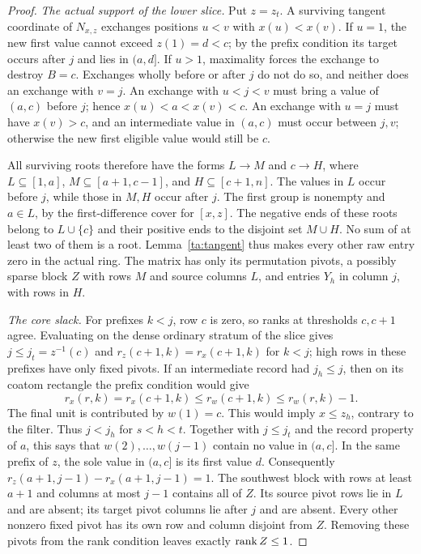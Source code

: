 \begin{proof}
\smallskip\noindent\emph{The actual support of the lower slice.}
Put $z=z_t$. A surviving tangent coordinate of $N_{x,z}$ exchanges
positions $u<v$ with $x(u)<x(v)$. If $u=1$, the new first value
cannot exceed $z(1)=d<c$; by the prefix condition its target occurs
after $j$ and lies in $(a,d]$. If $u>1$, maximality
forces the exchange to destroy $B=c$. Exchanges wholly before or after
$j$ do not do so, and neither does an exchange with $v=j$.
An exchange with $u<j<v$ must bring a value of $(a,c)$ before $j$;
hence $x(u)<a<x(v)<c$. An exchange with $u=j$ must have $x(v)>c$,
and an intermediate value in $(a,c)$ must occur between $j,v$;
otherwise the new first eligible value would still be $c$.

All surviving roots therefore have the forms $L\longrightarrow M$
and $c\longrightarrow H$, where
$L\subseteq[1,a]$, $M\subseteq[a+1,c-1]$, and
$H\subseteq[c+1,n]$. The values in $L$ occur before $j$, while those
in $M,H$ occur after $j$. The first group is nonempty and $a\in L$,
by the first-difference cover for $[x,z]$.
The negative ends of these roots belong to $L\cup\{c\}$ and their
positive ends to the disjoint set $M\cup H$. No sum of at least two
of them is a root. Lemma~\ref{ta:tangent} thus makes every other raw
entry zero in the actual ring. The matrix has only its permutation
pivots, a possibly sparse block $Z$ with rows $M$ and source columns
$L$, and entries $Y_h$ in column $j$, with rows in $H$.

\smallskip\noindent\emph{The core slack.}
For prefixes $k<j$, row $c$ is zero, so ranks at thresholds $c,c+1$
agree. Evaluating on the dense ordinary stratum of the slice gives
$j\leq j_t=z^{-1}(c)$ and
$r_z(c+1,k)=r_x(c+1,k)$ for $k<j$; high rows in these prefixes have
only fixed pivots.
If an intermediate record had $j_h\leq j$, then on its coatom
rectangle the prefix condition would give
\[
 r_x(r,k)=r_x(c+1,k)\leq r_w(c+1,k)\leq r_w(r,k)-1.
\]
The final unit is contributed by $w(1)=c$. This would imply
$x\leq z_h$, contrary to the filter. Thus $j<j_h$ for $s<h<t$.
Together with $j\leq j_t$ and the record property of $a$, this says
that $w(2),\ldots,w(j-1)$ contain no value in $(a,c]$.
In the same prefix of $z$, the sole value in $(a,c]$ is its first
value $d$. Consequently
$r_z(a+1,j-1)-r_x(a+1,j-1)=1$.
The southwest block with rows at least $a+1$ and columns at most
$j-1$ contains all of $Z$. Its source pivot rows lie in $L$ and are
absent; its target pivot columns lie after $j$ and are absent.
Every other nonzero fixed pivot has its own row and column disjoint
from $Z$. Removing these pivots from the rank condition leaves
exactly $\operatorname{rank} Z\leq1$.


\end{proof}
